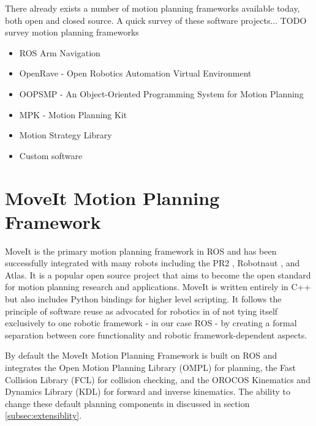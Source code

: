 \documentclass[10pt,journal,compsoc]{joser1}
\begin{document}
{There already exists a number of motion planning frameworks available today, both open and closed source. A quick survey of these software projects... TODO survey motion planning frameworks

\begin{itemize}
    \item ROS Arm Navigation
    \item OpenRave - Open Robotics Automation Virtual Environment
    \item OOPSMP - An Object-Oriented Programming System for Motion Planning
    \item MPK - Motion Planning Kit
    \item Motion Strategy Library
    \item Custom software
\end{itemize}

\section{MoveIt Motion Planning Framework}
\label{sec::moveit}

MoveIt is the primary motion planning framework in ROS and has been successfully integrated with many robots including the PR2 \cite{wyrobek2008towards}, Robotnaut \cite{ambrose2000robonaut}, and Atlas. It is a popular open source project that aims to become the open standard for motion planning research and applications. MoveIt is written entirely in C++ but also includes Python bindings for higher level scripting. It follows the principle of software reuse as advocated for robotics in \cite{makarenko2007benefits} of not tying itself exclusively to one robotic framework - in our case ROS - by creating a formal separation between core functionality and robotic framework-dependent aspects. 

By default the MoveIt Motion Planning Framework is built on ROS and integrates the Open Motion Planning Library (OMPL) \cite{sucan2012the-open-motion-planning-library} for planning, the Fast Collision Library (FCL) \cite{fcl} for collision checking, and the OROCOS Kinematics and Dynamics Library (KDL) \cite{kdl} for forward and inverse kinematics. The ability to change these default planning components in discussed in section \ref{subsec:extensiblity}.

}
\end{document}
